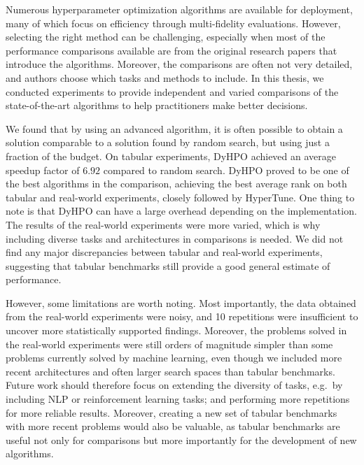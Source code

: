 





Numerous hyperparameter optimization algorithms are available for deployment, many of which focus on efficiency through multi-fidelity evaluations. However, selecting the right method can be challenging, especially when most of the performance comparisons available are from the original research papers that introduce the algorithms. Moreover, the comparisons are often not very detailed, and authors choose which tasks and methods to include. In this thesis, we conducted experiments to provide independent and varied comparisons of the state-of-the-art algorithms to help practitioners make better decisions.

We found that by using an advanced algorithm, it is often possible to obtain a solution comparable to a solution found by random search, but using just a fraction of the budget. On tabular experiments, DyHPO achieved an average speedup factor of $6.92$ compared to random search. DyHPO proved to be one of the best algorithms in the comparison, achieving the best average rank on both tabular and real-world experiments, closely followed by HyperTune. One thing to note is that DyHPO can have a large overhead depending on the implementation. The results of the real-world experiments were more varied, which is why including diverse tasks and architectures in comparisons is needed. We did not find any major discrepancies between tabular and real-world experiments, suggesting that tabular benchmarks still provide a good general estimate of performance.

However, some limitations are worth noting. Most importantly, the data obtained from the real-world experiments were noisy, and 10 repetitions were insufficient to uncover more statistically supported findings. Moreover, the problems solved in the real-world experiments were still orders of magnitude simpler than some problems currently solved by machine learning, even though we included more recent architectures and often larger search spaces than tabular benchmarks. Future work should therefore focus on extending the diversity of tasks, e.g.\ by including NLP or reinforcement learning tasks; and performing more repetitions for more reliable results. Moreover, creating a new set of tabular benchmarks with more recent problems would also be valuable, as tabular benchmarks are useful not only for comparisons but more importantly for the development of new algorithms.


